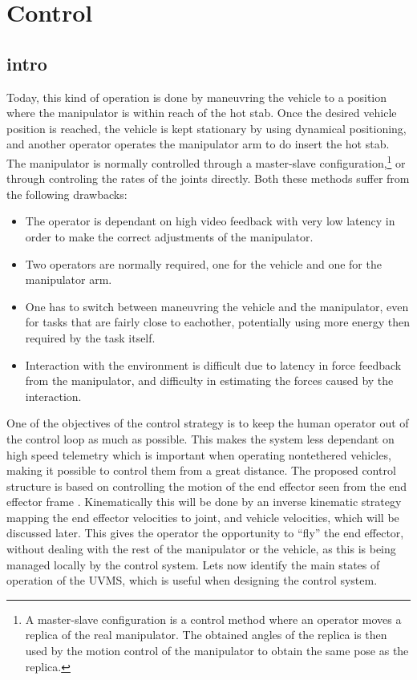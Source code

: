 
\section{Control}

\subsection{intro}
Today, this kind of operation is done by maneuvring the vehicle to a position where the manipulator is within reach of the hot stab. Once the desired vehicle position is reached, the vehicle is kept stationary by using dynamical positioning, and another operator operates the manipulator arm to do insert the hot stab. The manipulator is normally controlled through a master-slave configuration,\footnote{A master-slave configuration is a control method where an operator moves a replica of the real manipulator. The obtained angles of the replica is then used by the motion control of the manipulator to obtain the same pose as the replica.} 
or through controling the rates of the joints directly. Both these methods suffer from the following drawbacks:

\begin{itemize}
	\item The operator is dependant on high video feedback with very low latency in order to make the correct adjustments of the manipulator.  
	\item Two operators are normally required, one for the vehicle and one for the manipulator arm.
	\item One has to switch between maneuvring the vehicle and the manipulator, even for tasks that are fairly close to eachother, potentially using more energy then required by the task itself. 
	\item Interaction with the environment is difficult due to latency in force feedback from the manipulator, and difficulty in estimating the forces caused by the interaction.
\end{itemize}
One of the objectives of the control strategy is to keep the human operator out of the control loop as much as possible. This makes the system less dependant on high speed telemetry which is important when operating nontethered vehicles, making it possible to control them from a great distance. 
The proposed control structure is based on controlling the motion of the end effector seen from the end effector frame . Kinematically this will be done by an inverse kinematic strategy mapping the end effector velocities 
to joint, and vehicle velocities, which will be discussed later. This gives the operator the opportunity to ``fly'' the end effector, without dealing with the rest of the manipulator or the vehicle, as this is being managed locally by the control system. 
Lets now identify the main states of operation of the UVMS, which is useful when designing the control system. 

